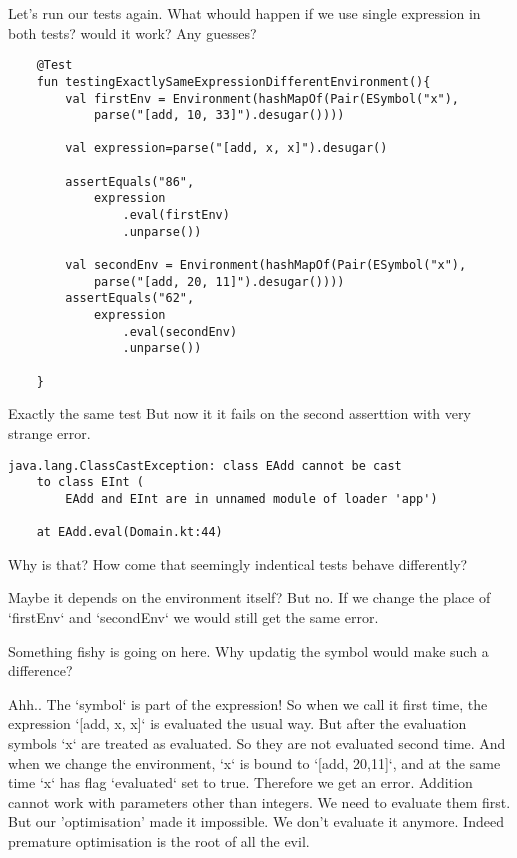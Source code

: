 \documentclass[11pt]{article}
\begin{document}
Let's run our tests again.
What whould happen if we use single expression in both tests?
would it work? Any guesses?
\begin{verbatim}
    @Test
    fun testingExactlySameExpressionDifferentEnvironment(){
        val firstEnv = Environment(hashMapOf(Pair(ESymbol("x"),
            parse("[add, 10, 33]").desugar())))

        val expression=parse("[add, x, x]").desugar()

        assertEquals("86",
            expression
                .eval(firstEnv)
                .unparse())

        val secondEnv = Environment(hashMapOf(Pair(ESymbol("x"),
            parse("[add, 20, 11]").desugar())))
        assertEquals("62",
            expression
                .eval(secondEnv)
                .unparse())

    }
\end{verbatim}

Exactly the same test
But now it it fails on the second asserttion with very strange error.

\begin{verbatim}
java.lang.ClassCastException: class EAdd cannot be cast
    to class EInt (
        EAdd and EInt are in unnamed module of loader 'app')

	at EAdd.eval(Domain.kt:44)
\end{verbatim}

Why is that? How come that seemingly indentical tests behave differently?

Maybe it depends on the environment itself? But no.
If we change the place of `firstEnv` and `secondEnv` we would still get the same error.

Something fishy is going on here. Why updatig the symbol would make such a difference?

Ahh.. The `symbol` is part of the expression!
So when we call it first time, the expression `[add, x, x]` is evaluated the usual way.
But after the evaluation symbols `x` are treated as evaluated.
So they are not evaluated second time.
And when we change the environment, `x` is bound to `[add, 20,11]`, and at the same time `x` has flag `evaluated` set to true.
Therefore we get an error.
Addition cannot work with parameters other than integers. We need to evaluate them first. But our 'optimisation' made it impossible. We don't evaluate it anymore.
Indeed premature optimisation is the root of all the evil.
\end{document}
